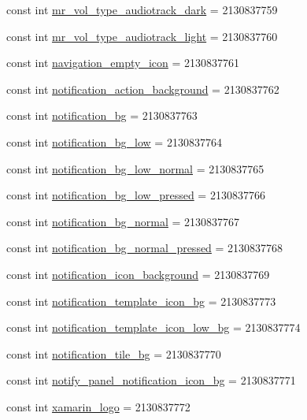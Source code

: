 \begin{CompactItemize}
\item 
const int \hyperlink{class__2doo_1_1_droid_1_1_resource_1_1_drawable_2b09e398bf31e4fab316307966aa0d0d}{mr\_\-vol\_\-type\_\-audiotrack\_\-dark} = 2130837759
\item 
const int \hyperlink{class__2doo_1_1_droid_1_1_resource_1_1_drawable_fba1ed03b1641a95c9fda84478a40a0f}{mr\_\-vol\_\-type\_\-audiotrack\_\-light} = 2130837760
\item 
const int \hyperlink{class__2doo_1_1_droid_1_1_resource_1_1_drawable_f29332aca74e10769ba06340884e6ed1}{navigation\_\-empty\_\-icon} = 2130837761
\item 
const int \hyperlink{class__2doo_1_1_droid_1_1_resource_1_1_drawable_9361a6cc3a97145d05abca17fdea40d0}{notification\_\-action\_\-background} = 2130837762
\item 
const int \hyperlink{class__2doo_1_1_droid_1_1_resource_1_1_drawable_893391ce9df9a4e8b67f9cb04651cb5b}{notification\_\-bg} = 2130837763
\item 
const int \hyperlink{class__2doo_1_1_droid_1_1_resource_1_1_drawable_78d5998f03b6b8394330de96818162e5}{notification\_\-bg\_\-low} = 2130837764
\item 
const int \hyperlink{class__2doo_1_1_droid_1_1_resource_1_1_drawable_2b8411f60092a68439ddbf17ee4abe05}{notification\_\-bg\_\-low\_\-normal} = 2130837765
\item 
const int \hyperlink{class__2doo_1_1_droid_1_1_resource_1_1_drawable_e42f34373a9f86d06ad4740e1fcc4109}{notification\_\-bg\_\-low\_\-pressed} = 2130837766
\item 
const int \hyperlink{class__2doo_1_1_droid_1_1_resource_1_1_drawable_df76e6c387f83dd538fc521ac05979ad}{notification\_\-bg\_\-normal} = 2130837767
\item 
const int \hyperlink{class__2doo_1_1_droid_1_1_resource_1_1_drawable_042842b80f8ea5b7b9a007d88ac70c5d}{notification\_\-bg\_\-normal\_\-pressed} = 2130837768
\item 
const int \hyperlink{class__2doo_1_1_droid_1_1_resource_1_1_drawable_9172d4cc07d853e5b27d711c4e9b5313}{notification\_\-icon\_\-background} = 2130837769
\item 
const int \hyperlink{class__2doo_1_1_droid_1_1_resource_1_1_drawable_f6279ab84f46cad5b383257c06b3db5e}{notification\_\-template\_\-icon\_\-bg} = 2130837773
\item 
const int \hyperlink{class__2doo_1_1_droid_1_1_resource_1_1_drawable_73f9cbcc1610d25c9515f85d03899a40}{notification\_\-template\_\-icon\_\-low\_\-bg} = 2130837774
\item 
const int \hyperlink{class__2doo_1_1_droid_1_1_resource_1_1_drawable_b035b05570e0c1274752a63b4da8d867}{notification\_\-tile\_\-bg} = 2130837770
\item 
const int \hyperlink{class__2doo_1_1_droid_1_1_resource_1_1_drawable_8b25dacaa1f962be2ef7cf42319c06be}{notify\_\-panel\_\-notification\_\-icon\_\-bg} = 2130837771
\item 
const int \hyperlink{class__2doo_1_1_droid_1_1_resource_1_1_drawable_25cfff810eae205cf1dc24a6323c0486}{xamarin\_\-logo} = 2130837772
\end{CompactItemize}
